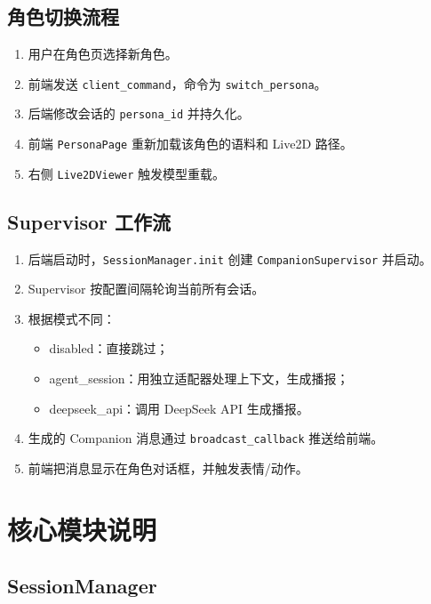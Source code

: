 \documentclass[12pt,a4paper]{article}
\begin{document}
\subsection{角色切换流程}

\begin{enumerate}[leftmargin=2em]
  \item 用户在角色页选择新角色。
  \item 前端发送 \texttt{client\_command}，命令为 \texttt{switch\_persona}。
  \item 后端修改会话的 \texttt{persona\_id} 并持久化。
  \item 前端 \texttt{PersonaPage} 重新加载该角色的语料和 Live2D 路径。
  \item 右侧 \texttt{Live2DViewer} 触发模型重载。
\end{enumerate}

\subsection{Supervisor 工作流}

\begin{enumerate}[leftmargin=2em]
  \item 后端启动时，\texttt{SessionManager.init} 创建 \texttt{CompanionSupervisor} 并启动。
  \item Supervisor 按配置间隔轮询当前所有会话。
  \item 根据模式不同：
  \begin{itemize}
    \item disabled：直接跳过；
    \item agent\_session：用独立适配器处理上下文，生成播报；
    \item deepseek\_api：调用 DeepSeek API 生成播报。
  \end{itemize}
  \item 生成的 Companion 消息通过 \texttt{broadcast\_callback} 推送给前端。
  \item 前端把消息显示在角色对话框，并触发表情/动作。
\end{enumerate}

\section{核心模块说明}

\subsection{SessionManager}
\end{document}
